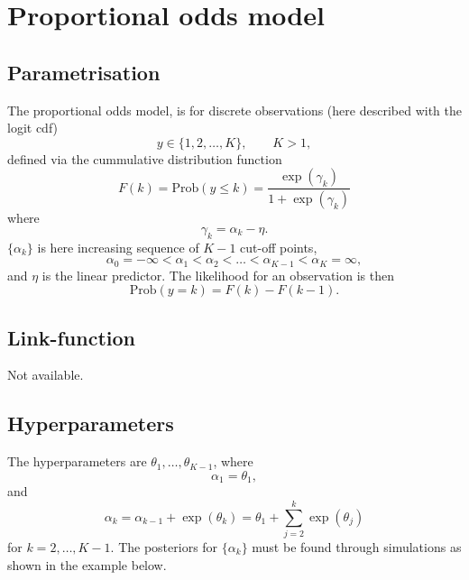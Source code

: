 \documentclass[a4paper,11pt]{article}
\begin{document}
\section*{Proportional odds model}

\subsection*{Parametrisation}

The proportional odds model, is for discrete observations (here
described with the logit cdf)
\begin{displaymath}
    y \in \{ 1, 2, \ldots, K\}, \qquad K>1,
\end{displaymath}
defined via the cummulative distribution function
\begin{displaymath}
    F(k) = \text{Prob}(y \le k)  = \frac{\exp(\gamma_k)}{1 + \exp(\gamma_k)}
\end{displaymath}
where
\begin{displaymath}
    \gamma_k = \alpha_k - \eta.
\end{displaymath}
$\{\alpha_k\}$ is here increasing sequence of $K-1$ cut-off points, 
\begin{displaymath}
    \alpha_{0} = -\infty < \alpha_1 < \alpha_2 < \ldots < \alpha_{K-1}
    < \alpha_K=\infty,
\end{displaymath}
and $\eta$ is the linear predictor. The likelihood for an observation
is then
\begin{displaymath}
    \text{Prob}(y = k) = F(k) - F(k-1).
\end{displaymath}

\subsection*{Link-function}

Not available.

\subsection*{Hyperparameters}

The hyperparameters are $\theta_1, \ldots, \theta_{K-1}$, where
\begin{displaymath}
    \alpha_1 = \theta_1,
\end{displaymath}
and 
\begin{displaymath}
    \alpha_{k} = \alpha_{k-1} + \exp(\theta_{k}) = \theta_1 +
    \sum_{j=2}^{k} \exp(\theta_j)
\end{displaymath}
for $k=2, \ldots, K-1$. The posteriors for $\{\alpha_k\}$ must be
found through simulations as shown in the example below.
\end{document}
